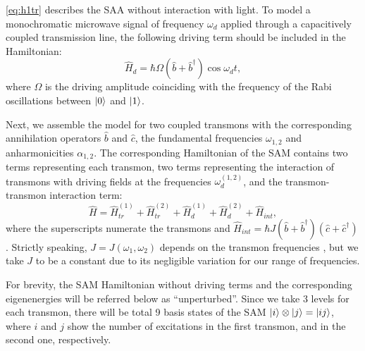\documentclass[%
 aps, prx,
 amsmath,amssymb,
 reprint,%
superscriptaddress
]{revtex4-2}
\begin{document}
\autoref{eq:h1tr} describes the SAA without 
interaction with light. To model a monochromatic 
microwave signal of frequency $\omega_d$ applied 
through a capacitively coupled transmission line, 
the following driving term should be included in 
the Hamiltonian:
\begin{equation}
\hat H_{d} = \hbar \Omega (\hat b+\hat b^{\dagger}) \cos\omega_d t,
\end{equation}
where $\Omega$ is the driving amplitude coinciding with the frequency of the Rabi oscillations between $\ket{0}$ and $\ket{1}$.

Next, we assemble the model for two coupled 
transmons with the corresponding annihilation 
operators $\hat b$ and $\hat c$, the fundamental 
frequencies $\omega_{1,2}$ and anharmonicities 
$\alpha_{1,2}$. The corresponding Hamiltonian of 
the SAM contains two terms representing each 
transmon, two terms representing the interaction 
of transmons with driving fields at the 
frequencies $\omega_d^{(1,2)}$, and the 
transmon-transmon interaction term:
\begin{equation}\label{Hsystem}
\hat H = \hat H_{tr}^{(1)}+\hat H_{tr}^{(2)}+\hat H_{d}^{(1)}+\hat H_{d}^{(2)}+\hat H_{int},
\end{equation}
where the superscripts numerate the transmons and $\hat H_{int} = \hbar J (\hat b +\hat 
b^\dag)(\hat c+\hat c^{\dagger})$. 
Strictly speaking, $J = J(\omega_1, \omega_2)$ 
depends on the transmon 
frequencies \cite{koch2007charge}, but we take $J$ 
to be a constant due to its negligible variation for our range of frequencies.


For brevity, the SAM Hamiltonian without driving 
terms and the corresponding eigenenergies will be 
referred below as ``unperturbed''. Since we take 
3 levels for each transmon, there will be total 9 
basis states of the SAM $\ket{i}\otimes \ket{j} = 
\ket{ij}$, where $i$ and $j$ show the number of 
excitations in the first transmon, and in the 
second one, respectively.
\end{document}
